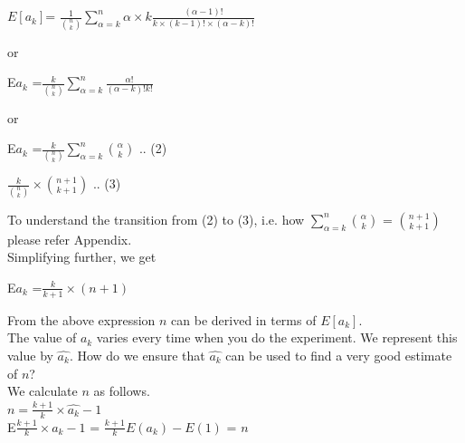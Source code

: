 \documentclass{llncs}
\begin{document}
\begin{center}
$E[a_k]$= $ \frac{1}{\binom{n}{k}} \sum_{\alpha=k}^n \alpha \times k \frac{(\alpha -1)!} {k \times (k-1)! \times (\alpha -k)!}$
\end{center}

or\\

\begin{center}
E\lbrack $a_k$ \rbrack=$\frac{k}{\binom {n} {k}} \sum_{\alpha=k}^n \frac {\alpha !}{(\alpha - k)!k!}$\\
\end{center}

or \\

\begin{center}

E\lbrack $a_k$ \rbrack=$\frac{k}{\binom {n} {k}} \sum_{\alpha=k}^n \binom {\alpha} {k}$ \hspace{1cm} .. (2)\\
\end{center}

\begin{center}
$\frac{k}{\binom {n} {k}} \times \binom {n+1}{k+1}$ \hspace{1cm} .. (3)\\
\end{center}

To understand the transition from (2) to (3), i.e. how $ \sum_{\alpha=k}^n \binom{\alpha}{k} $ = $ \binom {n+1}{k+1}$ please refer Appendix. \\
Simplifying further, we get\\

\begin{center}
E\lbrack $a_k$ \rbrack=$\frac{k}{k+1}\times  (n+1)$\\
\end{center}
From the above expression $n$ can be derived in terms of $E[a_k]$.\\

The value of $a_k$ varies every time  when you do the experiment. We represent this value by $\hat{a_k}$. How do we ensure that $\hat{a_k}$ can be used to find a very good estimate of $n$?\\

We calculate $n$ as follows.\\

$n= \frac{k+1}{k} \times \hat{a_k}-1$\\

 E\lbrack $ \frac{k+1}{k} \times a_k  - 1 $ \rbrack 
 = $\frac{k+1}{k}   E(a_k) - E(1)$ = $n$ \\
\end{document}

